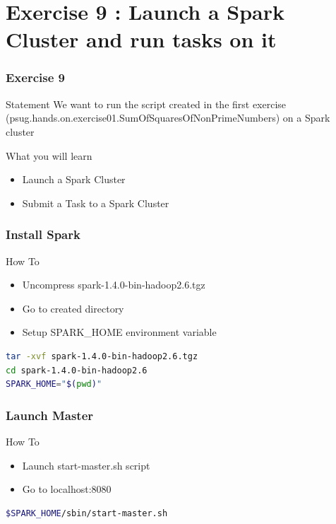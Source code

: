 \documentclass[slidetop,9pt,utf8]{beamer}
\begin{document}
\section{Exercise 9 : Launch a Spark Cluster and run tasks on it}

\begin{frame}
  \frametitle{Exercise 9}

  \begin{block}{Statement}
    We want to run the script created in the first exercise (psug.hands.on.exercise01.SumOfSquaresOfNonPrimeNumbers) on a
Spark cluster
  \end{block}

  \begin{block}{What you will learn}
    \begin{itemize}
      \item Launch a Spark Cluster
      \item Submit a Task to a Spark Cluster
    \end{itemize}
  \end{block}

\end{frame}

\begin{frame}[fragile]

  \frametitle{Install Spark}

  \begin{block}{How To}
    \begin{itemize}
      \item Uncompress spark-1.4.0-bin-hadoop2.6.tgz
      \item Go to created directory
      \item Setup SPARK\_HOME environment variable
    \end{itemize}
  \end{block}

  \begin{lstlisting}[language=bash, style=terminal-large]
tar -xvf spark-1.4.0-bin-hadoop2.6.tgz
cd spark-1.4.0-bin-hadoop2.6
SPARK_HOME="$(pwd)" 
  \end{lstlisting} 

\end{frame}

\begin{frame}[fragile]

  \frametitle{Launch Master}

  \begin{block}{How To}
    \begin{itemize}
      \item Launch start-master.sh script
      \item Go to localhost:8080
    \end{itemize}
  \end{block}

  \begin{lstlisting}[language=bash, style=terminal-large]
$SPARK_HOME/sbin/start-master.sh
  \end{lstlisting} 

\end{frame}
\end{document}
